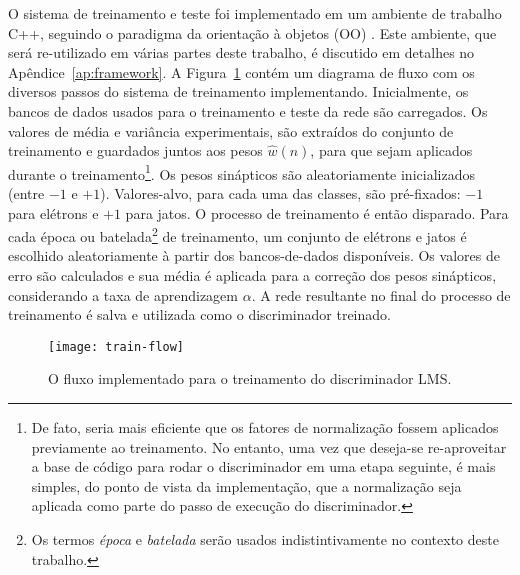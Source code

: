 O sistema de treinamento e teste foi implementado em um ambiente de trabalho
C++, seguindo o paradigma da orientação à objetos (OO) \cite{stroustrup,
booch}. Este ambiente, que será re-utilizado em várias partes deste trabalho,
é discutido em detalhes no Apêndice~\ref{ap:framework}. A
Figura~\ref{fig:train-flow} contém um diagrama de fluxo com os diversos passos
do sistema de treinamento implementando. Inicialmente, os bancos de dados
usados para o treinamento e teste da rede são carregados. Os valores de média
e variância experimentais, são extraídos do conjunto de treinamento e guardados
juntos aos pesos $\hat{w}(n)$, para que sejam aplicados durante o
treinamento\footnote{De fato, seria mais eficiente que os fatores de
normalização fossem aplicados previamente ao treinamento. No entanto, uma vez
que deseja-se re-aproveitar a base de código para rodar o discriminador em uma
etapa seguinte, é mais simples, do ponto de vista da implementação, que a
normalização seja aplicada como parte do passo de execução do
discriminador.}. Os pesos sinápticos são aleatoriamente inicializados (entre
$-1$ e $+1$). Valores-alvo, para cada uma das classes, são pré-fixados: $-1$
para elétrons e $+1$ para jatos. O processo de treinamento é então
disparado. Para cada época ou batelada\footnote{Os termos \textit{época} e
\textit{batelada} serão usados indistintivamente no contexto deste trabalho.}
de treinamento, um conjunto de elétrons e jatos é escolhido aleatoriamente à
partir dos bancos-de-dados disponíveis. Os valores de erro são calculados e
sua média é aplicada para a correção dos pesos sinápticos, considerando a taxa
de aprendizagem $\alpha$. A rede resultante no final do processo de
treinamento é salva e utilizada como o discriminador treinado.

\begin{figure}
\begin{center}
\texttt{[image: train-flow]}
\end{center}
\caption{O fluxo implementado para o treinamento do discriminador LMS.}
\label{fig:train-flow}
\end{figure}

